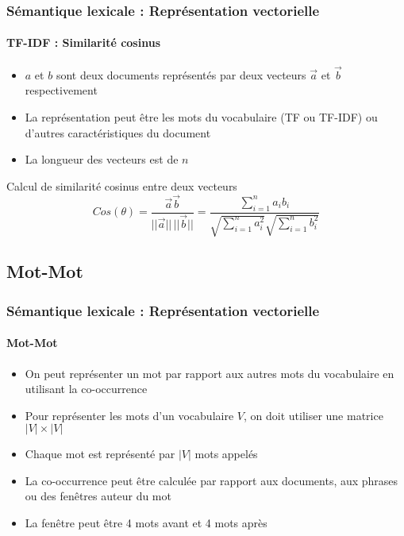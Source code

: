 \documentclass[xcolor=table]{beamer}
\begin{document}
\begin{frame}
\frametitle{Sémantique lexicale : Représentation vectorielle}
\framesubtitle{TF-IDF : Similarité cosinus}

\begin{minipage}{.68\textwidth}
\begin{itemize}
	\item $a$ et $b$ sont deux documents représentés par deux vecteurs $\overrightarrow{a}$ et $\overrightarrow{b}$ respectivement
	\item La représentation peut être les mots du vocabulaire (TF ou TF-IDF) ou d'autres caractéristiques du document
	\item La longueur des vecteurs est de $n$
\end{itemize}
\end{minipage}
\begin{minipage}{.3\textwidth}
\end{minipage}

\begin{block}{Calcul de similarité cosinus entre deux vecteurs}
	\[
	Cos(\theta) = \frac{\overrightarrow{a} \overrightarrow{b}}{||\overrightarrow{a}||\, ||\overrightarrow{b}||}
	= \frac{\sum_{i=1}^{n} a_i b_i}{\sqrt{\sum_{i=1}^{n} a_i^2} \sqrt{\sum_{i=1}^{n} b_i^2}}
	\]
\end{block}

\end{frame}

\subsection{Mot-Mot}

\begin{frame}
\frametitle{Sémantique lexicale : Représentation vectorielle}
\framesubtitle{Mot-Mot}

\begin{itemize}
	\item On peut représenter un mot par rapport aux autres mots du vocabulaire en utilisant la co-occurrence
	\item Pour représenter les mots d'un vocabulaire $ V $, on doit utiliser une matrice $|V| \times |V|$
	\item Chaque mot est représenté par $|V|$ mots appelés 
	\item La co-occurrence peut être calculée par rapport aux documents, aux phrases ou des fenêtres auteur du mot
	\item La fenêtre peut être 4 mots avant et 4 mots après
\end{itemize}

\end{frame}
\end{document}
